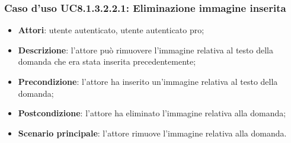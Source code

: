 \subsubsection{Caso d'uso UC8.1.3.2.2.1: Eliminazione immagine inserita}
		\begin{itemize}
		\item
			\textbf{Attori}: utente autenticato, utente autenticato pro;
		\item		
			\textbf{Descrizione}: l'attore può rimuovere l'immagine relativa al testo della domanda che era stata inserita precedentemente;
		\item
			\textbf{Precondizione}: l'attore ha inserito un'immagine relativa al testo della domanda;
		\item
			\textbf{Postcondizione}: l'attore ha eliminato l'immagine relativa alla domanda;
		\item
			\textbf{Scenario principale}: l'attore rimuove l'immagine relativa alla domanda. 
		\end{itemize}
	
